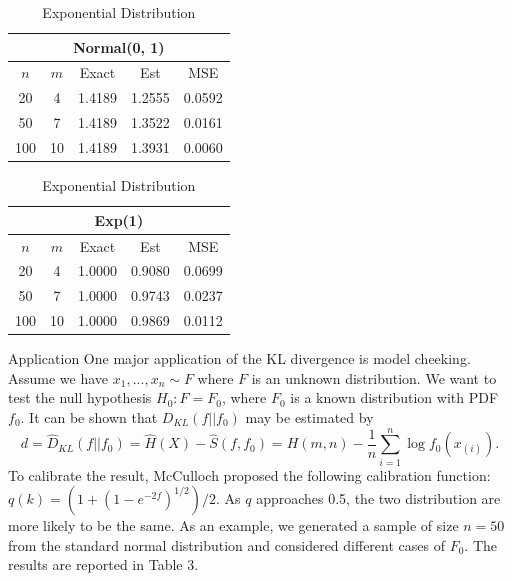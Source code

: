 \documentclass[final]{beamer}
\newlength{\onecolwid}
\begin{document}
\begin{frame}[t]
\begin{columns}[t]
\begin{column}{\onecolwid}
\begin{block}{}
\bigskip

        \begin{table}[ht]
        \centering
        \begin{minipage}{0.45\textwidth}
        \centering
        \begin{tabular}{|c|c|c|c|c|}
        \hline
        \multicolumn{5}{|c|}{Normal(0, 1)} \\
        \hline
        $n$ & $m$ & Exact & Est & MSE \\
        \hline
        20 & 4 & 1.4189 & 1.2555 & 0.0592 \\
        50 & 7 & 1.4189 & 1.3522 & 0.0161 \\
        100 & 10 & 1.4189 & 1.3931 & 0.0060 \\
        \hline
        \end{tabular}
        \caption{Normal Distribution}
        \end{minipage}
        \hspace{0.05\textwidth}
        \begin{minipage}{0.45\textwidth}
        \centering
        \begin{tabular}{|c|c|c|c|c|}
        \hline
        \multicolumn{5}{|c|}{Exp(1)} \\
        \hline
        $n$ & $m$ & Exact & Est & MSE \\
        \hline
        20 & 4 & 1.0000 & 0.9080 & 0.0699 \\
        50 & 7 & 1.0000 & 0.9743 & 0.0237 \\
        100 & 10 & 1.0000 & 0.9869 & 0.0112 \\
        \hline
        \end{tabular}
        \caption{Exponential Distribution}
        \end{minipage}
        \end{table}
        

    \end{block}  

    \begin{block}{Application}
        One major application of the KL divergence is model cheeking. Assume we have $x_1, ..., x_n\sim F$ where $F$ is an unknown distribution. We want to test the null hypothesis $H_0:F = F_0$, where $F_0$ is a known distribution with PDF $f_0$. It can be shown that  $D_{KL}(f || f_0)$ may be estimated by
        \begin{displaymath}
            d=\widehat{D}_{KL}(f || f_0) = \hat{H}(X) - \hat{S}(f, f_0) = H(m,n) - \frac{1}{n}\sum_{i=1}^{n}\log f_0(x_{(i)}).
        \end{displaymath}
To calibrate the result, McCulloch proposed the following calibration function:    $q(k) = (1+(1-e^{-2f})^{1/2})/2$.
        As $q$ approaches 0.5, the two distribution are more likely to be the same.
As an example, we generated a sample of size $n=50$ from the standard normal distribution and considered different cases of $F_0$. The results are reported in Table 3. 


\end{block}
\end{column}
\end{columns}
\end{frame}
\end{document}
